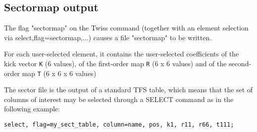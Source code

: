%
\subsection{Sectormap output}
\label{subsec:sectormap}

The flag "sectormap" on the Twiss command (together with an element
selection via select,flag=sectormap,...) causes a file "sectormap" to be
written.   

For each user-selected element, it contains the user-selected coefficients of the kick vector 
\texttt{K} (6 values), of the first-order map 
\texttt{R} (6 x 6 values) and of the second-order map 
\texttt{T} (6 x 6 x 6 values)

The sector file is the output of a standard TFS table, which means that
the set of columns of interest may be selected through a SELECT command
as in the following example:  


\begin{verbatim}
select, flag=my_sect_table, column=name, pos, k1, r11, r66, t111;
\end{verbatim}


